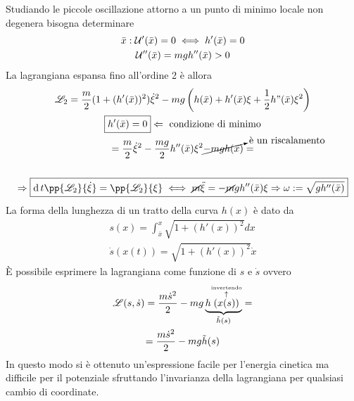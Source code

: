 \documentclass[Main.tex]{subfiles}
\begin{document}
\begin{tema}
Studiando le piccole oscillazione attorno a un punto di minimo locale non degenera bisogna determinare 
\begin{gather}
	\bar x: \mathcal{U}' (\bar x ) = 0 \iff h'( \bar x) =0 \\
	\mathcal{U}''( \bar x) = mg h'' ( \bar x) >0
\end{gather}
La lagrangiana espansa fino all'ordine 2 è allora
\begin{gather}
	\L_2 = \frac{m}{2} ( 1+ (h' (\bar x))^2)\dot \xi^2 -mg \left(h(\bar x)+ h'(\bar x) \xi + \frac{1}{2} h"(\bar x) \xi^2\right)\\
	\boxed{h'(\bar x)=0 } \Leftarrow \text{ condizione di minimo}\\
	= \frac{m}{2} \dot \xi^2 - \frac{mg}{2} h''(\bar x)\xi^2 \cancelto{\text{è un riscalamento}}{-mgh(\bar x)}=\\
	\ \notag \\
	\Rightarrow \boxed{\dd{}{t}\pp{\L_2}{\dot \xi}= \pp{\L_2}{\xi} \iff \cancel{m} \ddot \xi = - \cancel{m} g h''(\bar x) \xi \Rightarrow \omega:= \sqrt{g h''(\bar x)}}
\end{gather}
La forma della lunghezza di un tratto della curva $h(x)$ è dato da 
\begin{gather}
	s(x) = \int_{\bar x}^ x \sqrt{1 + (h'(x))^2}dx\\
	\dot s(x(t))= \sqrt{1+ (h'(x))^2} \dot x
\end{gather}
È possibile esprimere la lagrangiana come funzione di $s$ e $\dot s$ ovvero
\begin{gather}
	\mathscr{L}(s, \dot s) = \frac{m \dot s^2}{2} - mg\underbrace{h \overset{\overset{\text{invertendo}}{\uparrow}}{(x(s))}}_{\tilde h(s)}=\\
	= \frac{m \dot s^2}{2} - mg \tilde h(s)
\end{gather}
In questo modo si è ottenuto un'espressione facile per l'energia cinetica ma difficile per il potenziale sfruttando l'invarianza della lagrangiana per qualsiasi cambio di coordinate.
\end{tema}
\end{document}
